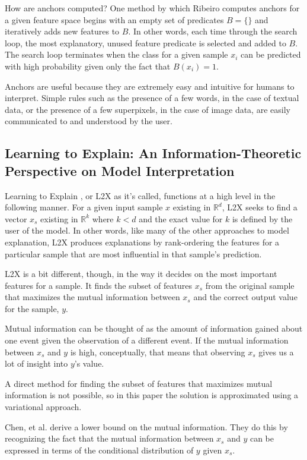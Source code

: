 \documentclass[12pt, letterpaper]{article}
\begin{document}
	How are anchors computed? One method by which Ribeiro computes anchors for a given feature space begins with an empty set of predicates $B = \{\}$ and iteratively adds new features to $B$. In other words, each time through the search loop, the most explanatory, unused feature predicate is selected and added to $B$. The search loop terminates when the class for a given sample $x_{i}$ can be predicted with high probability given only the fact that $B(x_{i}) = 1$.
	
	Anchors are useful because they are extremely easy and intuitive for humans to interpret. Simple rules such as the presence of a few words, in the case of textual data, or the presence of a few  superpixels, in the case of image data, are easily communicated to and understood by the user.

\subsection{Learning to Explain: An Information-Theoretic Perspective
on Model Interpretation}
Learning to Explain \cite{L2X}, or L2X as it's called, functions at a high level in the following manner. For a given input sample $x$ existing in $\mathbb{R}^{d}$, L2X seeks to find a vector $x_{s}$ existing in $\mathbb{R}^{k}$ where $k<d$ and the exact value for $k$ is defined by the user of the model. In other words, like many of the other approaches to model explanation, L2X produces explanations by rank-ordering the features for a particular sample that are most influential in that sample's prediction.

L2X is a bit different, though, in the way it decides on the most important features for a sample. It finds the subset of features $x_{s}$ from the original sample that maximizes the mutual information between $x_{s}$ and the correct output value for the sample, $y$. 

Mutual information can be thought of as the amount of information gained about one event given the observation of a different event. If the mutual information between $x_{s}$ and $y$ is high, conceptually, that means that observing $x_{s}$ gives us a lot of insight into $y$'s value.

A direct method for finding the subset of features that maximizes mutual information is not possible, so in this paper the solution is approximated using a variational approach.

Chen, et al. derive a lower bound on the mutual information. They do this by recognizing the fact that the mutual information between $x_{s}$ and $y$ can be expressed in terms of the conditional distribution of $y$ given $x_{s}$.
\end{document}
